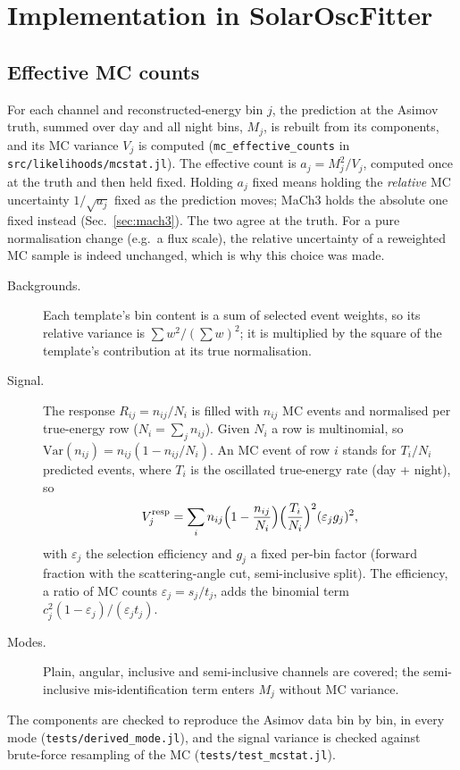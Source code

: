 \documentclass[11pt,a4paper]{article}
\newcommand{\code}[1]{\texttt{#1}}
\begin{document}
\section{Implementation in SolarOscFitter}

\subsection{Effective MC counts}

For each channel and reconstructed-energy bin $j$, the prediction at the Asimov truth, summed over
day and all night bins, $M_j$, is rebuilt from its components, and its MC variance $V_j$ is
computed (\code{mc\_effective\_counts} in \code{src/likelihoods/mcstat.jl}). The effective count is
$a_j = M_j^2/V_j$, computed once at the truth and then held fixed. Holding $a_j$ fixed means holding
the \emph{relative} MC uncertainty $1/\sqrt{a_j}$ fixed as the prediction moves; MaCh3 holds the
absolute one fixed instead (Sec.~\ref{sec:mach3}). The two agree at the truth. For a pure normalisation change
(e.g.\ a flux scale), the relative uncertainty of a reweighted MC sample is indeed unchanged, which
is why this choice was made.
\begin{description}
  \item[Backgrounds.] Each template's bin content is a sum of selected event weights, so its
    relative variance is $\sum w^2/(\sum w)^2$; it is multiplied by the square of the template's
    contribution at its true normalisation.
  \item[Signal.] The response $R_{ij} = n_{ij}/N_i$ is filled with $n_{ij}$ MC events and normalised
    per true-energy row ($N_i=\sum_j n_{ij}$). Given $N_i$ a row is multinomial, so
    $\mathrm{Var}(n_{ij}) = n_{ij}(1-n_{ij}/N_i)$. An MC event of row $i$ stands for $T_i/N_i$
    predicted events, where $T_i$ is the oscillated true-energy rate (day + night), so
    \begin{equation}
      V_j^{\mathrm{resp}} = \sum_i n_{ij}\Bigl(1-\frac{n_{ij}}{N_i}\Bigr)\Bigl(\frac{T_i}{N_i}\Bigr)^2
      (\varepsilon_j g_j)^2 ,
    \end{equation}
    with $\varepsilon_j$ the selection efficiency and $g_j$ a fixed per-bin factor (forward
    fraction with the scattering-angle cut, semi-inclusive split). The efficiency, a ratio of MC
    counts $\varepsilon_j = s_j/t_j$, adds the binomial term $c_j^2(1-\varepsilon_j)/(\varepsilon_j t_j)$.
  \item[Modes.] Plain, angular, inclusive and semi-inclusive channels are covered; the
    semi-inclusive mis-identification term enters $M_j$ without MC variance.
\end{description}
The components are checked to reproduce the Asimov data bin by bin, in every mode
(\code{tests/derived\_mode.jl}), and the signal variance is checked against brute-force resampling
of the MC (\code{tests/test\_mcstat.jl}).
\end{document}
